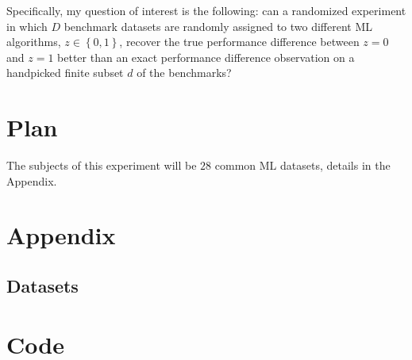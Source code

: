 \documentclass[11pt, oneside]{article}
\begin{document}
Specifically, my question of interest is the following: can a randomized
experiment in which $D$ benchmark datasets are randomly assigned to two
different ML algorithms, $z \in \left\{ 0, 1 \right\}$, recover the true
performance difference between $z = 0$ and $z = 1$ better than an exact
performance difference observation on a handpicked finite subset $d$ of the
benchmarks?

\section*{Plan}

The subjects of this experiment will be $28$ common ML datasets, details in 
the Appendix.


\newpage

\section*{Appendix}

\subsection*{Datasets}




\newpage

\section*{Code}
\end{document}
